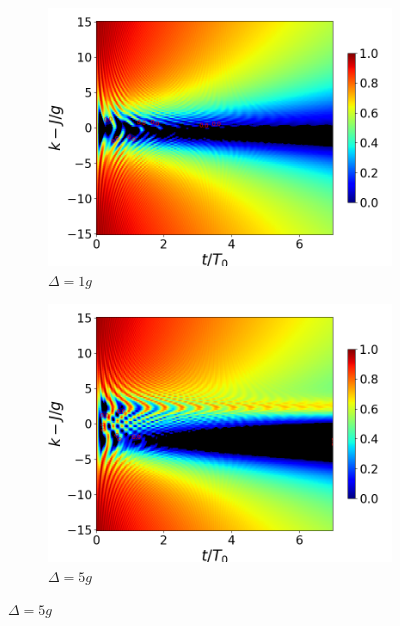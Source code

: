 \begin{figure}[h!]
    \centering
    \begin{subfigure}{0.49\textwidth}
        \includegraphics[width=\textwidth]{figuras/ch4/concu/k/eg1+ge1 d=1.0g x=0.0g J=15.0g gamma=0.25g concu k dis.png}
        \caption{$\Delta=1g$}
        \label{fig4:concu k 1 d1}
    \end{subfigure}
    \hfill
    \begin{subfigure}{0.49\textwidth}
        \includegraphics[width=\textwidth]{figuras/ch4/concu/k/eg1+ge1 d=5.0g x=0.0g J=15.0g gamma=0.25g concu k dis.png}
        \caption{$\Delta=5g$}
        \label{fig4:concu k 1 d2}
    \end{subfigure}
    \vfill

\end{figure}
